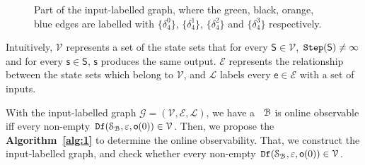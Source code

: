 \begin{figure}[thpb]
      \centering
      \caption{Part of the input-labelled graph, where the green, black, orange, blue edges are labelled with $\{\delta_4^0\}$, $\{\delta_4^1\}$, $\{\delta_4^2\}$ and $\{\delta_4^3\}$ respectively.}
      \label{fig:4}
\end{figure}
Intuitively, $\mathcal{V}$ represents a set of the state sets that for every $\mathsf{S}\in \mathcal{V}$, ${\tt Step}(\mathsf{S})\ne \infty$ and for every $\mathsf{s}\in\mathsf{S}$, $\mathsf{s}$ produces the same output. $\mathcal{E}$ represents the relationship between the state sets which belong to $\mathcal{V}$, and $\mathcal{L}$ labels every $\mathsf{e} \in\mathcal{E}$ with a set of inputs. %


With the input-labelled graph $\mathcal{G}=(\mathcal{V}, \mathcal{E}, \mathcal{L})$, we have a \BCN\ ${\mathcal{B}}$ is online observable iff every non-empty ${\tt Df}(\mathcal{S}_{\mathcal{B}},\varepsilon, \mathsf{o}(0))\in \mathcal{V}$.
 Then, we propose the {\bf Algorithm~\ref{alg:1}} to determine the online observability. That, we construct the input-labelled graph, and check whether every non-empty ${\tt Df}(\mathcal{S}_{\mathcal{B}},\varepsilon, \mathsf{o}(0))\in \mathcal{V}$.
 
